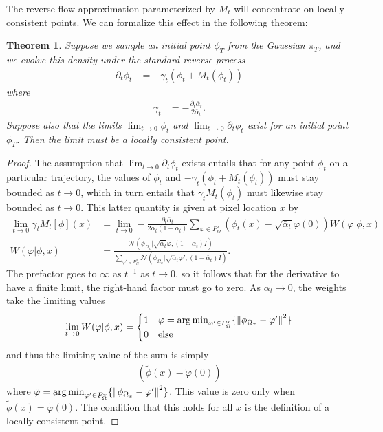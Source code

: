 \documentclass{article}
\theoremstyle{plain}
\newtheorem{theorem}{Theorem}[section]
\theoremstyle{definition}
\theoremstyle{remark}
\DeclareMathOperator*{\argmin}{arg\,min}
\begin{document}
The reverse flow approximation parameterized by $M_t$ will concentrate on locally consistent points. We can formalize this effect in the following theorem:
\begin{theorem}
    Suppose we sample an initial point $\phi_T$ from the Gaussian $\pi_T$, and we evolve this density under the standard reverse process
    \begin{align}\label{eq:simple_reverse}
        \partial_t \phi_t &= -\gamma_t(\phi_t + M_t(\phi_t))
    \end{align}
    where
    \begin{align}
        \gamma_t &= -\frac{\partial_t \bar{\alpha}_t}{2\bar{\alpha}_t}.
    \end{align}
    Suppose also that the limits $\lim_{t \to 0} \phi_t$ and $\lim_{t \to 0} \partial_t\phi_t$ exist for an initial point $\phi_T$. Then the limit must be a locally consistent point.
\end{theorem}
\begin{proof}
    The assumption that $\lim_{t \to 0} \partial_{t} \phi_t$ exists entails that for any point $\phi_t$ on a particular trajectory, the values of $\phi_t$ and $ -\gamma_t (\phi_t + M_t(\phi_t))$ must stay bounded as $t \to 0$, which in turn entails that $\gamma_t M_t(\phi_t)$ must likewise stay bounded as $t \to 0$. This latter quantity is given at pixel location $x$ by
    \begin{align}
        \lim_{t \to 0} \gamma_t M_t[\phi](x) &= \lim_{t \to 0} -\frac{\partial_t \bar{\alpha}_t}{2\bar{\alpha}_t(1 - \bar{\alpha}_t)} \sum_{\varphi \in P^x_{\Omega}} (\phi_t(x) - \sqrt{\bar{\alpha}_t} \varphi(0)) W(\varphi|\phi,x)\\
        W(\varphi|\phi,x) &= \frac{\mathcal{N}(\phi_{\Omega_x}|\sqrt{\bar{\alpha}_t} \varphi,(1- \bar{\alpha}_t)I)}{\sum_{\varphi' \in P_{\Omega}^x} \mathcal{N}(\phi_{\Omega_x}|\sqrt{\bar{\alpha}_t} \varphi',(1- \bar{\alpha}_t)I)}.
    \end{align}
    The prefactor goes to $\infty$ as $t^{-1}$ as $t \to 0$, so it follows that for the derivative to have a finite limit, the right-hand factor must go to zero. As $\bar{\alpha}_t \to 0$, the weights take the limiting values
    \begin{align}
        \lim_{t \to 0} W(\varphi|\phi, x) = \begin{cases}
            1 & \varphi = \argmin_{\varphi' \in P_\Omega^x}\{ \norm{\phi_{\Omega_x} - \varphi'}^2 \}\\
            0 & \text{else}
        \end{cases}
    \end{align}
    and thus the limiting value of the sum is simply
    \begin{align}
        (\tilde{\phi}(x) - \tilde{\varphi}(0))
    \end{align}
    where $\tilde{\varphi} = \argmin_{\varphi' \in P_\Omega^x}\{ \norm{\phi_{\Omega_x} - \varphi'}^2 \}$. This value is zero only when $\tilde{\phi}(x) = \tilde{\varphi}(0)$. The condition that this holds for all $x$ is the definition of a locally consistent point.
\end{proof}
\end{document}
